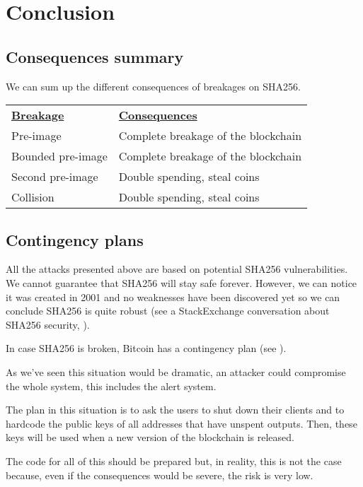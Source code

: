 \section{Conclusion}

  \subsection{Consequences summary}

We can sum up the different consequences of breakages on SHA256. \newline

\begin{tabular}{ll}

  \underline{\textbf{Breakage}} & \underline{\textbf{Consequences}} \\
  Pre-image & Complete breakage of the blockchain \\
  Bounded pre-image & Complete breakage of the blockchain \\
  Second pre-image & Double spending, steal coins \\
  Collision & Double spending, steal coins \\

\end{tabular}

  \subsection{Contingency plans}

All the attacks presented above are based on potential SHA256 vulnerabilities. We cannot guarantee that SHA256 will stay safe forever. However, we can notice it was created in 2001 and no weaknesses have been discovered yet so we can conclude SHA256 is quite robust (see a StackExchange conversation about SHA256 security, \cite{SHA256_security}). \newline

In case SHA256 is broken, Bitcoin has a contingency plan (see \cite{contingency}).

As we've seen this situation would be dramatic, an attacker could compromise the whole system, this includes the alert system.

The plan in this situation is to ask the users to shut down their clients and to hardcode the public keys of all addresses that have unspent outputs. Then, these keys will be used when a new version of the blockchain is released. \newline

The code for all of this should be prepared but, in reality, this is not the case because, even if the consequences would be severe, the risk is very low.
